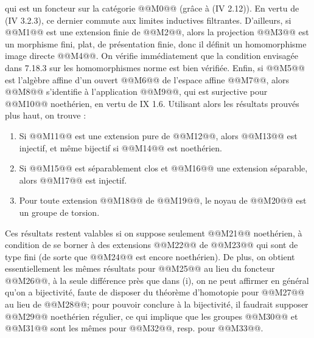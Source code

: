 
qui est un
foncteur sur la catégorie @@M0@@ (grâce à (IV 2.12)). En vertu de (IV 3.2.3), ce dernier commute aux limites inductives filtrantes. D'ailleurs, si @@M1@@ est une extension finie de @@M2@@, alors la projection @@M3@@ est un morphisme fini, plat, de présentation finie, donc il définit un homomorphisme image directe @@M4@@. On vérifie immédiatement que la condition envisagée dans 7.18.3 sur les homomorphismes norme est bien vérifiée. Enfin, si @@M5@@ est l'algèbre affine d'un ouvert @@M6@@ de l'espace affine @@M7@@, alors @@M8@@ s'identifie à l'application @@M9@@, qui est surjective pour @@M10@@ noethérien, en vertu de IX 1.6. Utilisant alors les résultats prouvés plus haut, on trouve :
\begin{enumerate}[label=(\roman*)]
\item Si @@M11@@ est une extension pure de @@M12@@, alors @@M13@@ est injectif, et même bijectif si @@M14@@ est noethérien.
\item Si @@M15@@ est séparablement clos et @@M16@@ une extension séparable, alors @@M17@@ est injectif.
\item Pour toute extension @@M18@@ de @@M19@@, le noyau de @@M20@@ est un groupe de torsion.
\end{enumerate}
Ces résultats restent valables si on suppose seulement @@M21@@ noethérien, à condition de se borner à des extensions @@M22@@ de @@M23@@ qui sont de type fini (de sorte que @@M24@@ est encore noethérien). De plus, on obtient essentiellement les mêmes résultats pour @@M25@@ au lieu du foncteur @@M26@@, à la seule différence près que dans (i), on ne peut affirmer en général qu'on a bijectivité, faute de disposer du théorème d'homotopie pour @@M27@@ au lieu de @@M28@@; pour pouvoir conclure à la bijectivité, il faudrait supposer @@M29@@ noethérien régulier, ce qui implique que les groupes @@M30@@ et @@M31@@ sont les mêmes pour @@M32@@, resp. pour @@M33@@.

